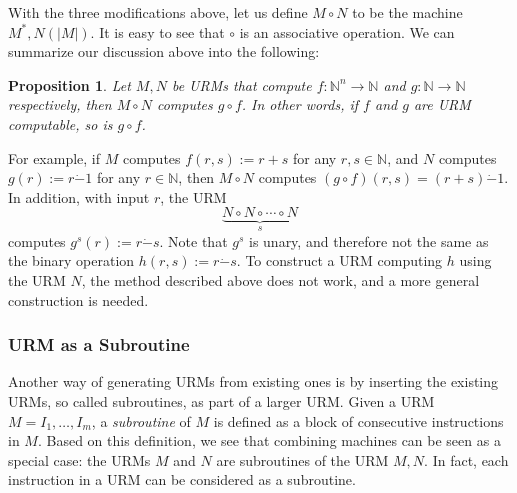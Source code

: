 \documentclass[12pt]{article}
\newtheorem{prop}{Proposition}
\begin{document}
With the three modifications above, let us define $M\circ N$ to be the machine $M^* , N(|M|)$.  It is easy to see that $\circ$ is an associative operation.  We can summarize our discussion above into the following:

\begin{prop}  Let $M,N$ be URMs that compute $f:\mathbb{N}^n \to \mathbb{N}$ and $g:\mathbb{N}\to \mathbb{N}$ respectively, then $M\circ N$ computes $g\circ f$.  In other words, if $f$ and $g$ are URM computable, so is $g\circ f$. \end{prop}

For example, if $M$ computes $f(r,s):=r+s$ for any $r,s\in \mathbb{N}$, and $N$ computes $g(r):=r\dot{-} 1$ for any $r\in \mathbb{N}$, then $M\circ N$ computes $(g\circ f)(r,s)=(r+s)\dot{-} 1$.  In addition, with input $r$, the URM 
$$\underbrace{N\circ N \circ \cdots \circ N}_s$$ computes $g^s(r):=r\dot{-} s$.  Note that $g^s$ is unary, and therefore not the same as the binary operation $h(r,s):=r\dot{-} s$.  To construct a URM computing $h$ using the URM $N$, the method described above does not work, and a more general construction is needed.

\subsubsection*{URM as a Subroutine}

Another way of generating URMs from existing ones is by inserting the existing URMs, so called subroutines, as part of a larger URM.  Given a URM $M=I_1,\ldots, I_m$, a \emph{subroutine} of $M$ is defined as a block of consecutive instructions in $M$.  Based on this definition, we see that combining machines can be seen as a special case: the URMs $M$ and $N$ are subroutines of the URM $M, N$.  In fact, each instruction in a URM can be considered as a subroutine.
\end{document}
